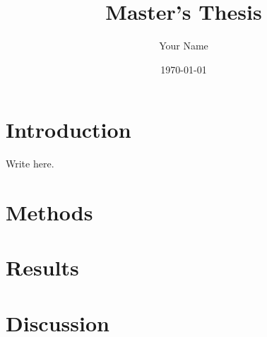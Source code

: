 \documentclass[12pt,a4paper]{report}
\title{Master's Thesis}
\author{Your Name}
\date{\today}
\begin{document}
\maketitle
\tableofcontents

\chapter{Introduction}
Write here.

\chapter{Methods}

\chapter{Results}

\chapter{Discussion}

\end{document}
